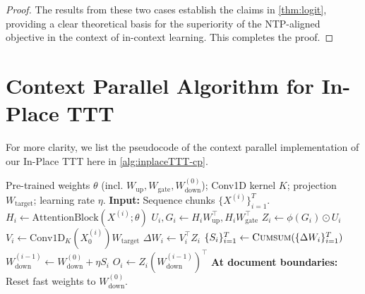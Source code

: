 \begin{proof}
\vspace{1em}
The results from these two cases establish the claims in \cref{thm:logit}, providing a clear theoretical basis for the superiority of the NTP-aligned objective in the context of in-context learning. This completes the proof.
\end{proof}

\section{Context Parallel Algorithm for In-Place TTT}
\label{app:cp}
For more clarity, we list the pseudocode of the context parallel implementation of our In-Place TTT here in \cref{alg:inplaceTTT-cp}.
\begin{algorithm}[h]
\caption{\textbf{In-Place TTT with Context Parallelism (Single Layer)}}
\label{alg:inplaceTTT-cp}
\begin{algorithmic}[1]
\Require Pre-trained weights $\theta$ (incl. $W_{\mathrm{up}}, W_{\mathrm{gate}}, W_{\mathrm{down}}^{(0)}$); Conv1D kernel $K$; projection $W_{\text{target}}$; learning rate $\eta$.
\State \textbf{Input:} Sequence chunks $\{X^{(i)}\}_{i=1}^{T}$. 
\vspace{3pt}
 
    \State $H_i \leftarrow \mathrm{AttentionBlock}(X^{(i)};\theta)$ 
    \State $U_i,G_i \leftarrow H_i W_{\mathrm{up}}^\top, H_i W_{\mathrm{gate}}^\top$
    \State $Z_i \leftarrow \phi(G_i)\odot U_i$
    \State $V_i \leftarrow \mathrm{Conv1D}_K(X_{0}^{(i)}) W_{\text{target}}$ 
    \State $\Delta W_i \leftarrow V_i^\top Z_i$ 
\EndFor
\vspace{3pt}
\State $\{S_i\}_{i=1}^T \leftarrow \textsc{Cumsum}( \{\Delta W_i\}_{i=1}^T )$ 
\vspace{3pt}
 
    \State $W_{\mathrm{down}}^{(i-1)} \leftarrow W_{\mathrm{down}}^{(0)} + \eta S_i$ 
    \State $O_i \leftarrow Z_i (W_{\mathrm{down}}^{(i-1)})^\top$
\EndFor
\vspace{3pt}
\State \textbf{At document boundaries:} Reset fast weights to $W_{\mathrm{down}}^{(0)}$.
\end{algorithmic}
\end{algorithm}




